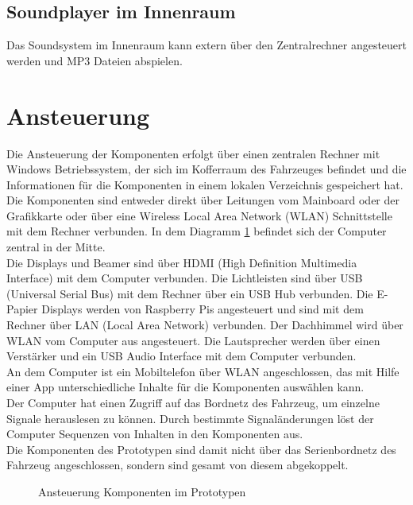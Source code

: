 \subsection{Soundplayer im Innenraum}
Das Soundsystem im Innenraum kann extern über den Zentralrechner angesteuert werden und MP3 Dateien abspielen.
\section{Ansteuerung}
Die Ansteuerung der Komponenten erfolgt über einen zentralen Rechner mit Windows Betriebssystem, der sich im Kofferraum des Fahrzeuges befindet und die Informationen für die Komponenten in einem lokalen Verzeichnis gespeichert hat. Die Komponenten sind entweder direkt über Leitungen vom Mainboard oder der Grafikkarte oder über eine Wireless Local Area Network (WLAN) Schnittstelle mit dem Rechner verbunden. In dem Diagramm \ref{fig:tikz_ansteuerung} befindet sich der Computer zentral in der Mitte.\\
Die Displays und Beamer sind über HDMI (High Definition Multimedia Interface) mit dem Computer verbunden. Die Lichtleisten sind über USB (Universal Serial Bus) mit dem Rechner über ein USB Hub verbunden. Die E-Papier Displays werden von Raspberry Pis angesteuert und sind mit dem Rechner über LAN (Local Area Network) verbunden. Der Dachhimmel wird über WLAN vom Computer aus angesteuert. Die Lautsprecher werden über einen Verstärker und ein USB Audio Interface mit dem Computer verbunden.\\
An dem Computer ist ein Mobiltelefon über WLAN angeschlossen, das mit Hilfe einer App unterschiedliche Inhalte für die Komponenten auswählen kann.\\
Der Computer hat einen Zugriff auf das Bordnetz des Fahrzeug, um einzelne Signale herauslesen zu können. Durch bestimmte Signaländerungen löst der Computer Sequenzen von Inhalten in den Komponenten aus.\\
Die Komponenten des Prototypen sind damit nicht über das Serienbordnetz des Fahrzeug angeschlossen, sondern sind gesamt von diesem abgekoppelt.
\begin{figure}[hbt]
	\centering
	
	\caption[Ansteuerung Komponenten im Prototypen]{Ansteuerung Komponenten im Prototypen}
	\label{fig:tikz_ansteuerung}
\end{figure}
